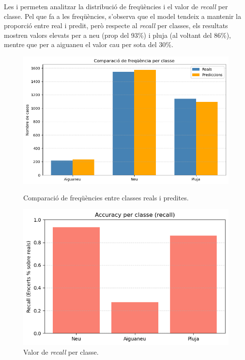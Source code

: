 \documentclass[../main.tex]{subfiles}
\begin{document}
Les  i  permeten analitzar la distribució de freqüències i el valor de \textit{recall} per classe. Pel que fa a les freqüències, s'observa que el model tendeix a mantenir la proporció entre real i predit, però respecte al  \textit{recall} per classes, els resultats mostren valors elevats per a neu (prop del 93\%) i pluja (al voltant del 86\%), mentre que per a aiguaneu el valor cau per sota del 30\%.


\begin{figure}[H]
    \centering
    \begin{minipage}[b]{0.48\textwidth}
        \centering
        \includegraphics[width=\textwidth]{figures/markov/5.png}
        \caption{Comparació de freqüències entre classes reals i predites.}
        \label{fig:markov5}
    \end{minipage}
    \hfill
    \begin{minipage}[b]{0.48\textwidth}
        \centering
        \includegraphics[width=\textwidth]{figures/markov/6.png}
        \caption{Valor de \textit{recall} per classe.}
        \label{fig:markov6}
    \end{minipage}
\end{figure}
\end{document}
